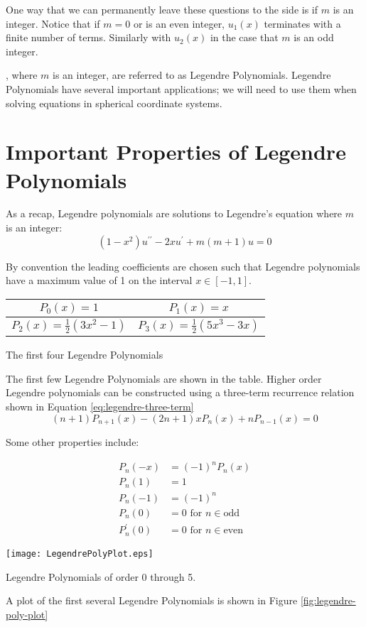 One way that we can permanently leave these questions to the side is if $m$ is an integer.  Notice that if $m=0$ or is an even integer, $u_1(x)$ terminates with a finite number of terms. Similarly with $u_2(x)$ in the case that $m$ is an odd integer. 

, where $m$ is an integer, are referred to as Legendre Polynomials.  Legendre Polynomials have several important applications; we will need to use them when solving equations in spherical coordinate systems.

\section{Important Properties of Legendre Polynomials}
As a recap, Legendre polynomials are solutions to Legendre's equation where $m$ is an integer:
\begin{equation*}
\left(1-x^2 \right)u^{\prime \prime} - 2xu^{\prime} + m(m+1)u = 0
\end{equation*}

By convention the leading coefficients are chosen such that Legendre polynomials have a maximum value of 1 on the interval $x\in[-1,1]$.  

\begin{margintable}
\begin{tabular}{c | c}
$P_0(x) = 1$ & $P_1(x) = x$ \\\hline
$P_2(x) = \frac{1}{2}(3x^2-1)$ & $P_3(x) = \frac{1}{2}(5x^3-3x)$ \\
\end{tabular}
\label{tab:Legendre-poly}
\caption{The first four Legendre Polynomials}
\end{margintable}
The first few Legendre Polynomials are shown in the table. Higher order Legendre polynomials can be constructed using a three-term recurrence relation shown in Equation \ref{eq:legendre-three-term}
\begin{equation}
(n+1)P_{n+1}(x) - (2n+1)xP_n(x) + nP_{n-1}(x) = 0
\label{eq:legendre-three-term}
\end{equation}

Some other properties include:

\begin{align*}
P_n(-x) &= (-1)^nP_n(x) \\
P_n(1) &= 1 \\
P_n(-1) &= (-1)^n \\
P_n(0) &= 0 \text{ for } n\in{\text{odd}} \\
P_n^{\prime}(0) &=0 \text{ for } n\in{\text{even}}
\end{align*}
\begin{marginfigure}
\texttt{[image: LegendrePolyPlot.eps]}
\caption{Legendre Polynomials of order 0 through 5.}
\label{fig:legendre-poly-plot}
\end{marginfigure}
A plot of the first several Legendre Polynomials is shown in Figure \ref{fig:legendre-poly-plot}


